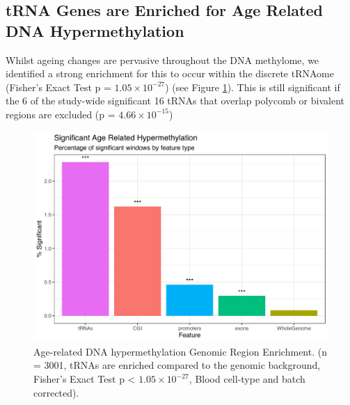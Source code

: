 \documentclass[]{book}
\begin{document}
\hypertarget{trna-genes-are-enriched-for-age-related-dna-hypermethylation}{%
\subsection{tRNA Genes are Enriched for Age Related DNA Hypermethylation}\label{trna-genes-are-enriched-for-age-related-dna-hypermethylation}}

Whilst ageing changes are pervasive throughout the DNA methylome, we identified a strong enrichment for this to occur within the discrete tRNAome (Fisher's Exact Test p = \(1.05\times10^{-27}\)) (see Figure \ref{fig:sizePropEnrich}).
This is still significant if the 6 of the study-wide significant 16 tRNAs that overlap polycomb or bivalent regions are excluded (p = \(4.66\times10^{-15}\))

\begin{figure}

{\centering \includegraphics[width=0.9\linewidth]{./figs/nSigWinProps_WGfishers_BB_sws_hyper_2_BL_noPolyBivExcl_BarTxtast_sr} 

}

\caption{Age-related DNA hypermethylation Genomic Region Enrichment. (n = 3001, tRNAs are enriched compared to the genomic background, Fisher's Exact Test p \textless{} \(1.05\times10^{-27}\), Blood cell-type and batch corrected).}\label{fig:sizePropEnrich}
\end{figure}
\end{document}
